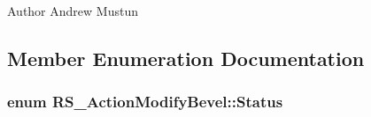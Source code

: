 \begin{DoxyAuthor}{Author}
Andrew Mustun 
\end{DoxyAuthor}


\subsection{Member Enumeration Documentation}
\hypertarget{classRS__ActionModifyBevel_a695143d8b22ff3f4d565cdb0e0663b1d}{
\subsubsection[{Status}]{\setlength{\rightskip}{0pt plus 5cm}enum {\bf R\-S\-\_\-\-Action\-Modify\-Bevel\-::\-Status}}}\label{classRS__ActionModifyBevel_a695143d8b22ff3f4d565cdb0e0663b1d}
